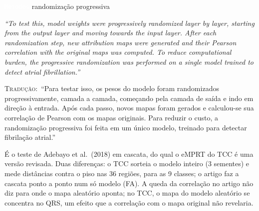 \documentclass[11pt,a4paper]{article}
\newcommand{\pagechip}[1]{{\setlength{\fboxsep}{1.5pt}\colorbox{cAcc}{\textcolor{white}{\scriptsize\texttt{#1}}}}}
\newenvironment{origquote}{\par\itshape\small}{\par}
\newenvironment{tradquote}{\par\small\textsc{Tradução:}\ }{\par}
\newcommand{\explab}[1]{\par\smallskip{\small\color{cAcc}\textbf{\MakeUppercase{#1}}}\par}
\begin{document}
\begin{citacard}{\pagechip{Métodos} randomização progressiva}
\begin{origquote}“To test this, model weights were progressively randomized layer by layer, starting from the output layer and moving towards the input layer. After each randomization step, new attribution maps were generated and their Pearson correlation with the original maps was computed. To reduce computational burden, the progressive randomization was performed on a single model trained to detect atrial fibrillation.”\end{origquote}
\begin{tradquote}“Para testar isso, os pesos do modelo foram randomizados progressivamente, camada a camada, começando pela camada de saída e indo em direção à entrada. Após cada passo, novos mapas foram gerados e calculou-se sua correlação de Pearson com os mapas originais. Para reduzir o custo, a randomização progressiva foi feita em um único modelo, treinado para detectar fibrilação atrial.”\end{tradquote}
\explab{Explicação}
É o teste de Adebayo et al.\ (2018) em cascata, do qual o eMPRT do TCC é uma versão revisada. Duas diferenças: o TCC sorteia o modelo inteiro (3 sementes) e mede distâncias contra o piso nas 36 regiões, para as 9 classes; o artigo faz a cascata ponto a ponto num só modelo (FA). A queda da correlação no artigo não diz para onde o mapa aleatório aponta; no TCC, o mapa do modelo aleatório se concentra no QRS, um efeito que a correlação com o mapa original não revelaria.
\end{citacard}
\end{document}
